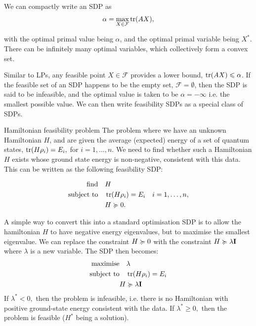 We can compactly write an SDP as
$$ \alpha = \max_{ X \in \mathcal{F}} \tr(AX),$$

with the optimal primal value being $\alpha$, and the optimal primal variable being $X^{*}$. There can be infinitely many optimal variables, which collectively form a convex set.

Similar to LPs, any feasible point $X \in \mathcal{F}$ provides a lower bound, $\tr(AX) \leqslant \alpha$. If the feasible set of an SDP happens to be the empty set, $\mathcal{F} = \emptyset$, then the SDP is said to be infeasible, and the optimal value is taken to be $\alpha = -\infty$ i.e. the smallest possible value.
We can then write feasibility SDPs as a special class of SDPs.

\begin{prf}{Hamiltonian feasibility problem}
    The problem where we have an unknown Hamiltonian $H$, and are given the average (expected) energy of a set of quantum states, $\tr(H\rho_{i}) = E_{i},$ for $i = 1, \ldots, n.$ We need to find whether such a Hamiltonian $H$ exists whose ground state energy is non-negative, consistent with this data.
    This can be written as the following feasibility SDP:

    \begin{align}
        \text{find}  \quad      & H                                              \\
        \text{subject to} \quad & \tr(H\rho_{i}) = E_{i} \quad i = 1, \ldots, n, \\
                                & H \succcurlyeq 0.
    \end{align}

    A simple way to convert this into a standard optimisation SDP is to allow the hamiltonian $H$ to have negative energy eigenvalues, but to maximise the smallest eigenvalue.
    We can replace the constraint $H \succcurlyeq 0$  with the constraint $H \succcurlyeq \lambda \mathbf{I}$ where $\lambda$ is a new variable. The SDP then becomes:
    \begin{align}
        \text{maximise}   & \quad \lambda                \\
        \text{subject to} & \quad \tr(H\rho_{i}) = E_{i} \\
                          & H \succcurlyeq \lambda \mathbf{I}
    \end{align}
    If $\lambda^{*} < 0,$ then the problem is infeasible, i.e. there is no Hamiltonian with positive ground-state energy consistent with the data.
    If $\lambda^{*} \ge 0,$ then the problem is feasible ($H^{*}$ being a solution).
\end{prf}

